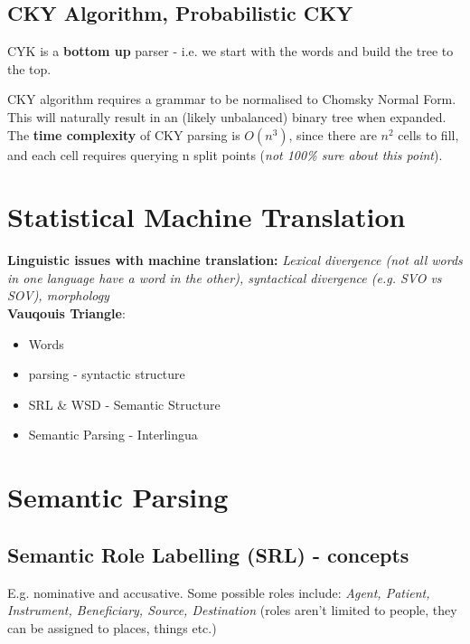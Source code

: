 \documentclass[]{article}
\begin{document}
	
	\subsection{CKY Algorithm, Probabilistic CKY}
	
	CYK is a \textbf{bottom up} parser - i.e. we start with the words and build the tree to the top. 
	
	CKY algorithm requires a grammar to be normalised to Chomsky Normal Form. This will naturally result in an (likely unbalanced) binary tree when expanded. \\
	
	The \textbf{time complexity} of CKY parsing is $O(n^3)$, since there are $n^2$ cells to fill, and each cell requires querying n split points (\textit{not 100\% sure about this point}). 
	
	
	\section{Statistical Machine Translation}
	
	\textbf{Linguistic issues with machine translation:} \textit{Lexical divergence (not all words in one language have a word in the other), syntactical divergence (e.g. SVO vs SOV), morphology} \\
	
	\textbf{Vauqouis Triangle}:
	
	\begin{itemize}
		\item Words 
		\item parsing -  syntactic structure
		\item SRL \& WSD - Semantic Structure
		\item Semantic Parsing -  Interlingua
	\end{itemize}
	
	
	\section{Semantic Parsing}
	
	\subsection{Semantic Role Labelling (SRL) - concepts}
	
	E.g. nominative and accusative. Some possible roles include: \textit{Agent, Patient, Instrument, Beneficiary, Source, Destination} (roles aren't limited to people, they can be assigned to places, things etc.)
	
\end{document}
